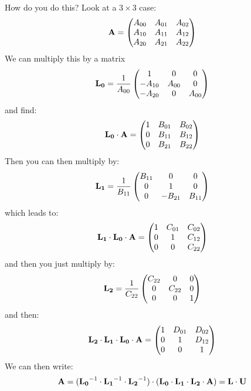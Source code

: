 How do you do this? Look at a $3\times 3$ case:
\begin{equation}
{\bf A} = 
\left(
\begin{matrix}
A_{00} & A_{01} & A_{02} \cr
A_{10} & A_{11} & A_{12} \cr
A_{20} & A_{21} & A_{22} \cr
\end{matrix}
\right)
\end{equation}
We can multiply this by a matrix
\begin{equation}
{\bf L_0} = 
\frac{1}{A_{00}}
\left(
\begin{matrix}
1 & 0 & 0 \cr
- A_{10} & A_{00} & 0 \cr
- A_{20} & 0 & A_{00} \cr
\end{matrix}
\right)
\end{equation}
and find:
\begin{equation}
{\bf L_0}\cdot{\bf A} = 
\left(
\begin{matrix}
1 & B_{01} & B_{02} \cr
0 & B_{11} & B_{12} \cr
0 & B_{21} & B_{22} \cr
\end{matrix}
\right)
\end{equation}
Then you can then multiply by:
\begin{equation}
{\bf L_1} = 
\frac{1}{B_{11}}
\left(
\begin{matrix}
B_{11} & 0 & 0 \cr
0 & 1 & 0 \cr
0 & - B_{21} & B_{11} \cr
\end{matrix}
\right)
\end{equation}
which leads to:
\begin{equation}
{\bf L_1}\cdot{\bf L_0}\cdot{\bf A} = 
\left(
\begin{matrix}
1 & C_{01} & C_{02} \cr
0 & 1 & C_{12} \cr
0 & 0 & C_{22} \cr
\end{matrix}
\right)
\end{equation}
and then you just multiply by:
\begin{equation}
{\bf L_2} = 
\frac{1}{C_{22}}
\left(
\begin{matrix}
C_{22} & 0 & 0 \cr
0 & C_{22} & 0 \cr
0 & 0 & 1 \cr
\end{matrix}
\right)
\end{equation}
and then:
\begin{equation}
{\bf L_2}\cdot{\bf L_1}\cdot{\bf L_0}\cdot{\bf A} = 
\left(
\begin{matrix}
1 & D_{01} & D_{02} \cr
0 & 1 & D_{12} \cr
0 & 0 & 1 \cr
\end{matrix}
\right)
\end{equation}
We can then write:
\begin{equation}
{\bf A} = 
({\bf L_0}^{-1}\cdot
{\bf L_1}^{-1}\cdot
{\bf L_2}^{-1})\cdot
({\bf L_0}\cdot
{\bf L_1}\cdot
{\bf L_2}\cdot{\bf A}) = {\bf L}\cdot{\bf U}
\end{equation}
